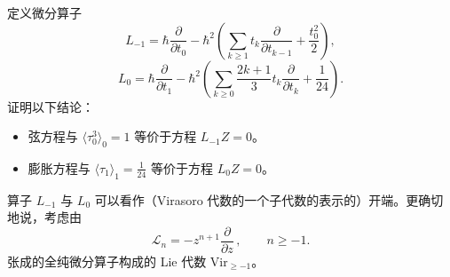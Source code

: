 \begin{exercise}[2.9]
定义微分算子
\begin{equation}
L_{-1}=\hbar\frac{\partial}{\partial t_0}-\hbar^2\left(\sum_{k\ge1}t_k\frac{\partial}{\partial t_{k-1}}+\frac{t_0^2}{2}\right), \tag{2.64}
\end{equation}
\begin{equation}
L_0=\hbar\frac{\partial}{\partial t_1}-\hbar^2\left(\sum_{k\ge0}\frac{2k+1}{3}t_k\frac{\partial}{\partial t_k}+\frac{1}{24}\right). \tag{2.65}
\end{equation}
证明以下结论：
\begin{itemize}
\item 弦方程与 $\langle\tau_0^3\rangle_0=1$ 等价于方程 $L_{-1}Z=0$。
\item 膨胀方程与 $\langle\tau_1\rangle_1=\frac{1}{24}$ 等价于方程 $L_0Z=0$。
\end{itemize}
\end{exercise}

算子 $L_{-1}$ 与 $L_0$ 可以看作（Virasoro 代数的一个子代数的表示的）开端。更确切地说，考虑由
\begin{equation}
\mathcal{L}_n=-z^{n+1}\frac{\partial}{\partial z}\,,\qquad n\ge-1. \tag{2.66}
\end{equation}
张成的全纯微分算子构成的 Lie 代数 $\mathrm{Vir}_{\ge-1}$。

